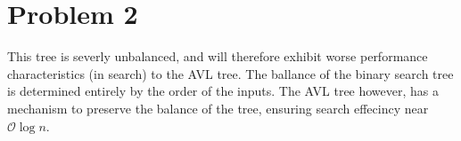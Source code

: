 \documentclass{article}
\newenvironment{problem}[1]{
  \nobreak\section*{Problem #1}
}{}
\begin{document}
\begin{problem}{2}
    This tree is severly unbalanced, and will therefore exhibit worse performance
    characteristics (in search) to the AVL tree.  The ballance of the binary search
    tree is determined entirely by the order of the inputs.  The AVL tree however,
    has a mechanism to preserve the balance of the tree, ensuring search effecincy
    near $\mathcal{O}\log{n}$.
  \end{problem}
\end{document}
